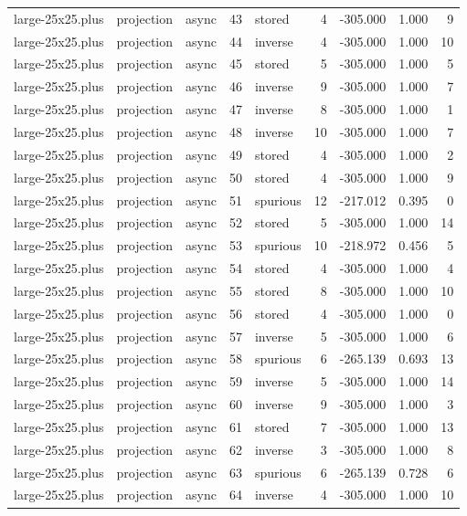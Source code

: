 \begin{tabular}{lllrlrrrr}
large-25x25.plus & projection & async & 43 & stored & 4 & -305.000 & 1.000 & 9 \\
large-25x25.plus & projection & async & 44 & inverse & 4 & -305.000 & 1.000 & 10 \\
large-25x25.plus & projection & async & 45 & stored & 5 & -305.000 & 1.000 & 5 \\
large-25x25.plus & projection & async & 46 & inverse & 9 & -305.000 & 1.000 & 7 \\
large-25x25.plus & projection & async & 47 & inverse & 8 & -305.000 & 1.000 & 1 \\
large-25x25.plus & projection & async & 48 & inverse & 10 & -305.000 & 1.000 & 7 \\
large-25x25.plus & projection & async & 49 & stored & 4 & -305.000 & 1.000 & 2 \\
large-25x25.plus & projection & async & 50 & stored & 4 & -305.000 & 1.000 & 9 \\
large-25x25.plus & projection & async & 51 & spurious & 12 & -217.012 & 0.395 & 0 \\
large-25x25.plus & projection & async & 52 & stored & 5 & -305.000 & 1.000 & 14 \\
large-25x25.plus & projection & async & 53 & spurious & 10 & -218.972 & 0.456 & 5 \\
large-25x25.plus & projection & async & 54 & stored & 4 & -305.000 & 1.000 & 4 \\
large-25x25.plus & projection & async & 55 & stored & 8 & -305.000 & 1.000 & 10 \\
large-25x25.plus & projection & async & 56 & stored & 4 & -305.000 & 1.000 & 0 \\
large-25x25.plus & projection & async & 57 & inverse & 5 & -305.000 & 1.000 & 6 \\
large-25x25.plus & projection & async & 58 & spurious & 6 & -265.139 & 0.693 & 13 \\
large-25x25.plus & projection & async & 59 & inverse & 5 & -305.000 & 1.000 & 14 \\
large-25x25.plus & projection & async & 60 & inverse & 9 & -305.000 & 1.000 & 3 \\
large-25x25.plus & projection & async & 61 & stored & 7 & -305.000 & 1.000 & 13 \\
large-25x25.plus & projection & async & 62 & inverse & 3 & -305.000 & 1.000 & 8 \\
large-25x25.plus & projection & async & 63 & spurious & 6 & -265.139 & 0.728 & 6 \\
large-25x25.plus & projection & async & 64 & inverse & 4 & -305.000 & 1.000 & 10 \\

\end{tabular}
